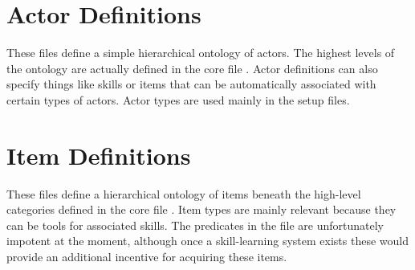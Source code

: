 \section{Actor Definitions}

These files define a simple hierarchical ontology of actors.
%
The highest levels of the ontology are actually defined in the core file .
%
Actor definitions can also specify things like skills or items that can be automatically associated with certain types of actors.
%
Actor types are used mainly in the setup files.


\section{Item Definitions}

These files define a hierarchical ontology of items beneath the high-level categories defined in the core file .
%
Item types are mainly relevant because they can be tools for associated skills.
%
The  predicates in the  file are unfortunately impotent at the moment, although once a skill-learning system exists these would provide an additional incentive for acquiring these items. 



\pagestyle{default}
